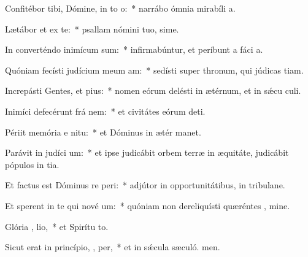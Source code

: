 \item Confitébor tibi, Dómine, in to  o:~* narrábo ómnia mirabíli a.
\item Lætábor et ex  te:~* psallam nómini tuo, sime.
\item In converténdo inimícum  sum:~* infirmabúntur, et períbunt a fáci a.
\item Quóniam fecísti judícium meum   am:~* sedísti super thronum, qui júdicas tiam.
\item Increpásti Gentes, et  pius:~* nomen eórum delésti in ætérnum, et in sǽcu culi.
\item Inimíci defecérunt frá  nem:~* et civitátes eórum deti.
\item Périit memória e  nitu:~* et Dóminus in ætér manet.
\item Parávit in judíci  um:~* et ipse judicábit orbem terræ in æquitáte, judicábit pópulos in tia.
\item Et factus est Dóminus re peri:~* adjútor in opportunitátibus, in tribulane.
\item Et sperent in te qui nové  um:~* quóniam non dereliquísti quæréntes , mine.
\item Glória ,  lio,~* et Spirítu to.
\item Sicut erat in princípio,  ,  per,~* et in sǽcula sæculó. men.
